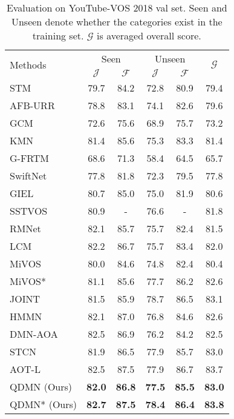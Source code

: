 \documentclass[runningheads]{llncs}
\begin{document}
    \begin{table}[t]
    \centering
    \caption{Evaluation on YouTube-VOS 2018 val set. 
    Seen and Unseen denote whether the categories exist in the training set.
    $\mathcal{G}$ is averaged overall score.}
    \label{youtube}
    \setlength\tabcolsep{11pt}
    \begin{tabular}{lccccc}
        \toprule[1.5pt]
        \multirow{2}{*}{Methods} &
        \multicolumn{2}{c}{Seen} & \multicolumn{2}{c}{Unseen} &
        \multirow{2}{*}{$\mathcal{G}$} \\
        \noalign{\smallskip} \cline{2-5} \noalign{\smallskip}
              & $\mathcal{J}$ & $\mathcal{F}$
              & $\mathcal{J}$ & $\mathcal{F}$ \\
        \midrule
STM~\cite{stm}          & 79.7    & 84.2  & 72.8    & 80.9  & 79.4          \\
    AFB-URR~\cite{afb-urr}          & 78.8    & 83.1  & 74.1    & 82.6  & 79.6          \\
    GCM~\cite{gcm}        & 72.6    & 75.6  & 68.9    & 75.7  & 73.2          \\
    KMN~\cite{kmn}          & 81.4    & 85.6  & 75.3   & 83.3  & 81.4          \\
    G-FRTM~\cite{g-frtm}    & 68.6    & 71.3  & 58.4   & 64.5  & 65.7          \\
    SwiftNet~\cite{swiftnet} & 77.8   & 81.8  & 72.3   & 79.5  & 77.8          \\
    GIEL~\cite{giel}         & 80.7   & 85.0  & 75.0   & 81.9  & 80.6          \\
    SSTVOS~\cite{sstvos}     & 80.9   & -     & 76.6     & -     & 81.8          \\
    RMNet~\cite{rmnet}       & 82.1   & 85.7  & 75.7   & 82.4  & 81.5          \\
    LCM~\cite{lcm}           & 82.2 & 86.7 & 75.7  & 83.4    & 82.0          \\
    MiVOS~\cite{mivos}       & {80.0}    & {84.6} & {74.8}   & {82.4}  & {80.4}          \\
    MiVOS*~\cite{mivos}      & {81.1}    & {85.6} & {77.7}  & {86.2} & {82.6}          \\
    JOINT~\cite{joint}                 & 81.5 & 85.9 & 78.7 & 86.5 & 83.1\\
    HMMN~\cite{hmm}                 & 82.1 & 87.0 & 76.8 & 84.6 & 82.6\\
    DMN-AOA~\cite{alignment}                 & 82.5 & 86.9 & 76.2 & 84.2 & 82.5\\
    STCN~\cite{stcn}                 & 81.9 & 86.5 & 77.9 & 85.7 & 83.0\\
    AOT-L~\cite{aot}  & 82.5   & 87.5 & 77.9 & 86.7 & 83.7 \\
    \midrule
    QDMN (Ours)      & \textbf{82.0}  & \textbf{86.8}  & \textbf{77.5}   & \textbf{85.5} & \textbf{83.0} \\
    QDMN* (Ours)     & \textbf{82.7}  & \textbf{87.5}  & \textbf{78.4}   & \textbf{86.4}               & \textbf{83.8} \\
    \bottomrule[1.5pt]
    \end{tabular}
    \end{table}     
\end{document}
